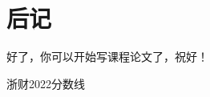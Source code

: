 \documentclass[12pt, a4paper, oneside, fontset=windows]{ctexart}
\begin{document}
\section{后记}
好了，你可以开始写课程论文了，祝好！


\newpage

\begin{thebibliography}{99}
    浙财2022分数线
\end{thebibliography}


\end{document}

